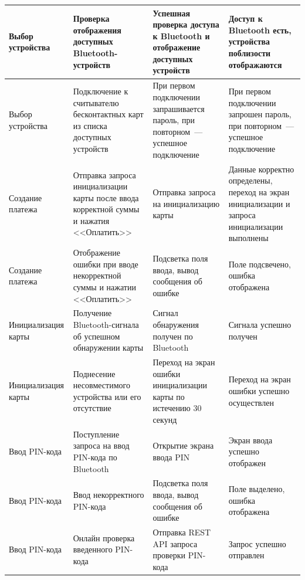 \begin{longtable}[l]{| P{0.18\textwidth} | P{0.2\textwidth} | P{0.26\textwidth} | P{0.26\textwidth}|}
    Выбор устройства &
    Проверка отображения доступных Bluetooth-устройств &
    Успешная проверка доступа к Bluetooth и отображение доступных устройств &
    Доступ к Bluetooth есть, устройства поблизости отображаются \\
    \hline

    Выбор устройства &
    Подключение к считывателю бесконтактных карт из списка доступных устройств &
    При первом подключении запрашивается пароль, при повторном~--- успешное подключение &
    При первом подключении запрошен пароль, при повторном~--- успешное подключение  \\
    \hline

    Создание платежа &
    Отправка запроса инициализации карты после ввода корректной суммы и нажатия <<Оплатить>> &
    Отправка запроса на инициализацию карты &
    Данные корректно определены, переход на экран инициализации и запроса инициализации выполнены \\
    \hline

    Создание платежа &
    Отображение ошибки при вводе некорректной суммы и нажатии <<Оплатить>> &
    Подсветка поля ввода, вывод сообщения об ошибке &
    Поле подсвечено, ошибка отображена \\
    \hline

    Инициализация карты &
    Получение Bluetooth-сигнала об успешном обнаружении карты &
    Сигнал обнаружения получен по Bluetooth &
    Сигнала успешно получен \\
    \hline

    Инициализация карты &
    Поднесение несовместимого устройства или его отсутствие &
    Переход на экран ошибки инициализации карты по истечению 30 секунд &
    Переход на экран ошибки успешно осуществлен \\
    \hline

    Ввод PIN-кода &
    Поступление запроса на ввод PIN-кода по Bluetooth &
    Открытие экрана ввода PIN &
    Экран ввода успешно отображен \\
    \hline

    Ввод PIN-кода &
    Ввод некорректного PIN-кода &
    Подсветка поля ввода, вывод сообщения об ошибке &
    Поле выделено, ошибка отображена \\
    \hline

    Ввод PIN-кода &
    Онлайн проверка введенного PIN-кода &
    Отправка REST API запроса проверки PIN-кода &
    Запрос успешно отправлен \\
    \hline


\end{longtable}

